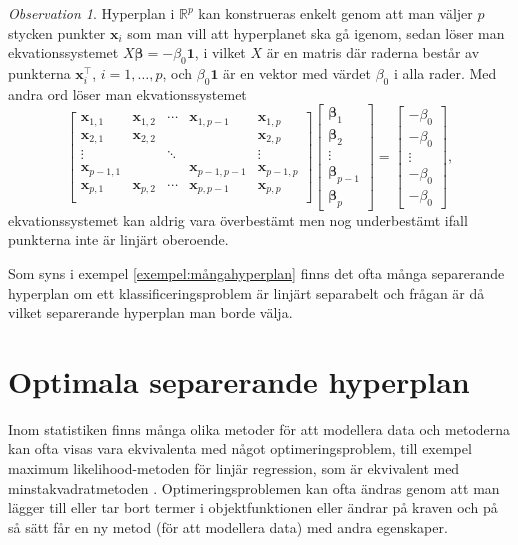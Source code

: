 \documentclass[a4paper, 12pt]{report}
\theoremstyle{definition}
\theoremstyle{remark}
\newtheorem*{rem}{Observation}
\newcommand{\bfbeta}{{\boldsymbol{\beta}}}
\newcommand{\bfx}{\mathbf{x}}
\begin{document}
\begin{rem}
	Hyperplan i $\mathbb{R}^p$ kan konstrueras enkelt genom att man väljer $p$ stycken punkter $\mathbf{x}_i$ som man vill att hyperplanet ska gå igenom, sedan löser man ekvationssystemet $X\bfbeta=-\beta_0\mathbf{1}$, i vilket $X$ är en matris där raderna består av punkterna $\mathbf{x}_i^\intercal$, $i=1,\dots, p$, och $\beta_0\mathbf{1}$ är en vektor med värdet $\beta_0$ i alla rader.
	Med andra ord löser man ekvationssystemet
	\begin{equation*}
		\begin{bmatrix}
		\bfx_{1,1}	& \bfx_{1,2}	& \cdots	& \bfx_{1,p-1}	& \bfx_{1,p}\\
		\bfx_{2,1}	& \bfx_{2,2}	&  			& 				& \bfx_{2,p}\\
		\vdots		&				& \ddots	&				& \vdots\\
		\bfx_{p-1,1}& 				&  			& \bfx_{p-1,p-1}	&\bfx_{p-1,p}\\
		\bfx_{p,1}	& \bfx_{p,2}	& \cdots	& \bfx_{p,p-1}	& \bfx_{p,p}\\
		\end{bmatrix}
		\begin{bmatrix}
		\bfbeta_1\\ \bfbeta_2\\\vdots\\\bfbeta_{p-1}\\\bfbeta_{p}
		\end{bmatrix}=
		\begin{bmatrix}
		-\beta_0\\-\beta_0\\\vdots\\-\beta_0\\-\beta_0
		\end{bmatrix},
	\end{equation*}
	ekvationssystemet kan aldrig vara överbestämt men nog underbestämt ifall punkterna inte är linjärt oberoende.
\end{rem}

Som syns i exempel \ref{exempel:mångahyperplan} finns det ofta många separerande hyperplan om ett klassificeringsproblem är linjärt separabelt och frågan är då vilket separerande hyperplan man borde välja.

\section{Optimala separerande hyperplan}
Inom statistiken finns många olika metoder för att modellera data och metoderna kan ofta visas vara ekvivalenta med något optimeringsproblem, till exempel maximum likelihood-metoden för linjär regression, som är ekvivalent med minstakvadratmetoden \cite{MLEOLS}.
Optimeringsproblemen kan ofta ändras genom att man lägger till eller tar bort termer i objektfunktionen eller ändrar på kraven och på så sätt får en ny metod (för att modellera data) med andra egenskaper.
\end{document}
